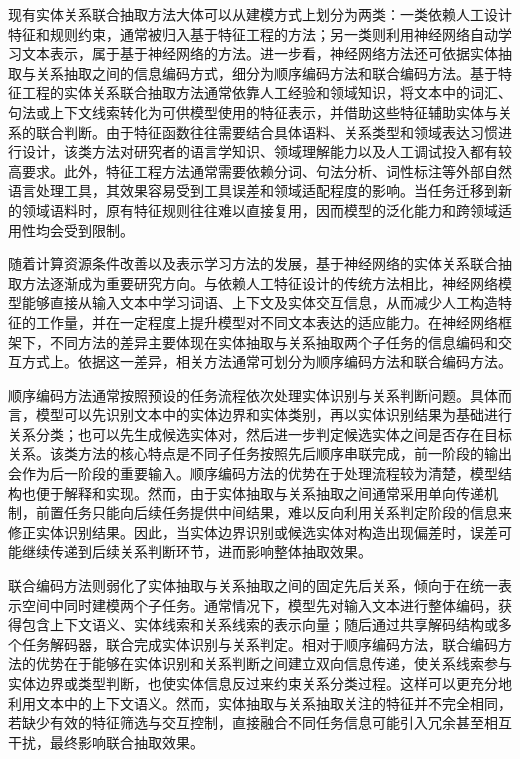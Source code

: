 现有实体关系联合抽取方法大体可以从建模方式上划分为两类：一类依赖人工设计特征和规则约束，通常被归入基于特征工程的方法；另一类则利用神经网络自动学习文本表示，属于基于神经网络的方法。进一步看，神经网络方法还可依据实体抽取与关系抽取之间的信息编码方式，细分为顺序编码方法和联合编码方法\cite{Zhao2024RelationExtractionSurvey,Miwa2016EndToEndRE}。基于特征工程的实体关系联合抽取方法通常依靠人工经验和领域知识，将文本中的词汇、句法或上下文线索转化为可供模型使用的特征表示，并借助这些特征辅助实体与关系的联合判断。由于特征函数往往需要结合具体语料、关系类型和领域表达习惯进行设计，该类方法对研究者的语言学知识、领域理解能力以及人工调试投入都有较高要求。此外，特征工程方法通常需要依赖分词、句法分析、词性标注等外部自然语言处理工具，其效果容易受到工具误差和领域适配程度的影响。当任务迁移到新的领域语料时，原有特征规则往往难以直接复用，因而模型的泛化能力和跨领域适用性均会受到限制\cite{Zhao2024RelationExtractionSurvey}。

随着计算资源条件改善以及表示学习方法的发展，基于神经网络的实体关系联合抽取方法逐渐成为重要研究方向。与依赖人工特征设计的传统方法相比，神经网络模型能够直接从输入文本中学习词语、上下文及实体交互信息，从而减少人工构造特征的工作量，并在一定程度上提升模型对不同文本表达的适应能力\cite{Zhao2024RelationExtractionSurvey}。在神经网络框架下，不同方法的差异主要体现在实体抽取与关系抽取两个子任务的信息编码和交互方式上。依据这一差异，相关方法通常可划分为顺序编码方法和联合编码方法。

顺序编码方法通常按照预设的任务流程依次处理实体识别与关系判断问题。具体而言，模型可以先识别文本中的实体边界和实体类别，再以实体识别结果为基础进行关系分类；也可以先生成候选实体对，然后进一步判定候选实体之间是否存在目标关系。该类方法的核心特点是不同子任务按照先后顺序串联完成，前一阶段的输出会作为后一阶段的重要输入。顺序编码方法的优势在于处理流程较为清楚，模型结构也便于解释和实现。然而，由于实体抽取与关系抽取之间通常采用单向传递机制，前置任务只能向后续任务提供中间结果，难以反向利用关系判定阶段的信息来修正实体识别结果。因此，当实体边界识别或候选实体对构造出现偏差时，误差可能继续传递到后续关系判断环节，进而影响整体抽取效果\cite{Zhao2024RelationExtractionSurvey}。

联合编码方法则弱化了实体抽取与关系抽取之间的固定先后关系，倾向于在统一表示空间中同时建模两个子任务。通常情况下，模型先对输入文本进行整体编码，获得包含上下文语义、实体线索和关系线索的表示向量；随后通过共享解码结构或多个任务解码器，联合完成实体识别与关系判定。相对于顺序编码方法，联合编码方法的优势在于能够在实体识别和关系判断之间建立双向信息传递，使关系线索参与实体边界或类型判断，也使实体信息反过来约束关系分类过程。这样可以更充分地利用文本中的上下文语义。然而，实体抽取与关系抽取关注的特征并不完全相同，若缺少有效的特征筛选与交互控制，直接融合不同任务信息可能引入冗余甚至相互干扰，最终影响联合抽取效果\cite{Miwa2016EndToEndRE,Zhao2024RelationExtractionSurvey}。


